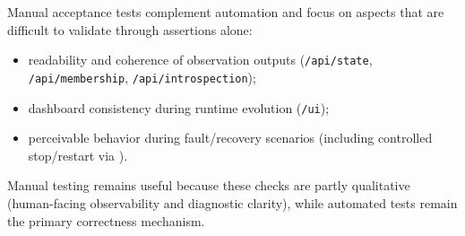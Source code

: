 Manual acceptance tests complement automation and focus on aspects that are difficult to validate through assertions alone:
\begin{itemize}
  \item readability and coherence of observation outputs (\texttt{/api/state}, \texttt{/api/membership}, \texttt{/api/introspection});
  \item dashboard consistency during runtime evolution (\texttt{/ui});
  \item perceivable behavior during fault/recovery scenarios (including controlled stop/restart via ).
\end{itemize}

Manual testing remains useful because these checks are partly qualitative (human-facing observability and diagnostic clarity), while automated tests remain the primary correctness mechanism.

\clearpage
